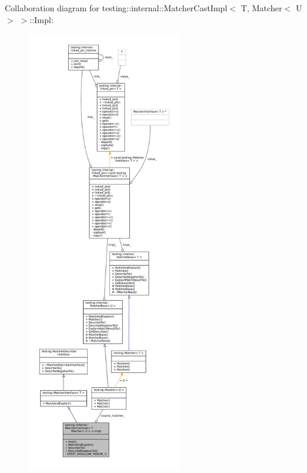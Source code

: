 Collaboration diagram for testing\+:\+:internal\+:\+:Matcher\+Cast\+Impl$<$ T, Matcher$<$ U $>$ $>$\+:\+:Impl\+:
\nopagebreak
\begin{figure}[H]
\begin{center}
\leavevmode
\includegraphics[height=550pt]{classtesting_1_1internal_1_1MatcherCastImpl_3_01T_00_01Matcher_3_01U_01_4_01_4_1_1Impl__coll__graph}
\end{center}
\end{figure}
